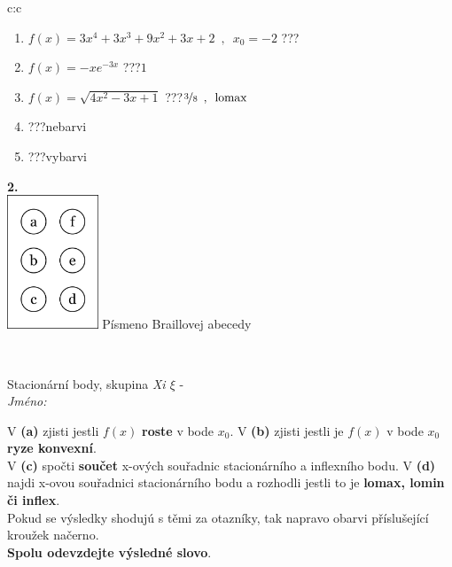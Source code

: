 \documentclass[10pt]{report}
\begin{document}
\begin{tabular}{c:c}
\begin{minipage}[c][104.5mm][t]{0.5\linewidth}
\begin{center}
\begin{minipage}{0.79\linewidth}
\begin{center}
\begin{varwidth}{\linewidth}
\begin{enumerate}
\item $f(x)=3x^4+3x^3+9x^2+3x+2\enspace , \enspace x_0=-2$\quad \dotfill\; ???\;\dotfill \quad {}
\item $f(x)=-xe^{-3x}$\quad \dotfill\; ???\;\dotfill \quad $1$
\item $f(x)=\sqrt{4x^2-3x+1}$\quad \dotfill\; ???\;\dotfill \quad $\nicefrac{3}{8}\enspace , \enspace\mathrm{lomax}$
\item \quad \dotfill\; ???\;\dotfill \quad nebarvi
\item \quad \dotfill\; ???\;\dotfill \quad vybarvi
\end{enumerate}
\end{varwidth}
\end{center}
\end{minipage}
\begin{minipage}{0.20\linewidth}
\begin{center}
{\Huge\bfseries 2.} \\[2mm]
\includegraphics[height=40mm]{../images/braille.png}
{\small Písmeno Braillovej abecedy}
\end{center}
\end{minipage}
\end{center}
\end{minipage}
\\ \hdashline
\begin{minipage}[c][104.5mm][t]{0.5\linewidth}
\begin{center}
\vspace{7mm}
{\huge Stacionární body, skupina \textit{Xi $\xi$} -}\\[5mm]
\textit{Jméno:}\phantom{xxxxxxxxxxxxxxxxxxxxxxxxxxxxxxxxxxxxxxxxxxxxxxxxxxxxxxxxxxxxxxxxx}\\[5mm]
\begin{minipage}{0.95\linewidth}
\begin{center}
{\small V \textbf{(a)} zjisti jestli $f(x)$ \textbf{roste} v bode $x_0$. V \textbf{(b)} zjisti jestli je $f(x)$ v bode $x_0$ \textbf{ryze konvexní}.\\V \textbf{(c)} spočti \textbf{součet} x-ových souřadnic stacionárního a inflexního bodu. V \textbf{(d)} najdi x-ovou souřadnici stacionárního bodu a rozhodli jestli to je \textbf{lomax, lomin či inflex}.\\Pokud se výsledky shodujú s těmi za otazníky, tak napravo obarvi příslušející kroužek načerno.\\\textbf{Spolu odevzdejte výsledné slovo}}.

\end{center}
\end{minipage}
\end{center}
\end{minipage}
\end{tabular}
\end{document}

